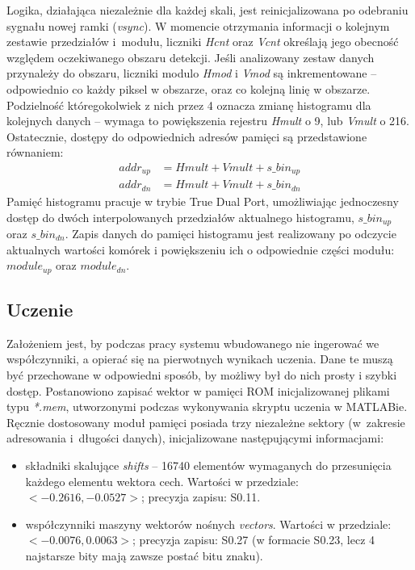 Logika, działająca niezależnie dla każdej skali, jest reinicjalizowana po odebraniu sygnału nowej ramki (\textit{vsync}). 
W momencie otrzymania informacji o kolejnym zestawie przedziałów i~modułu, liczniki \textit{Hcnt} oraz \textit{Vcnt} określają jego obecność względem oczekiwanego obszaru detekcji. %
Jeśli analizowany zestaw danych przynależy do obszaru, liczniki modulo \textit{Hmod} i \textit{Vmod} są inkrementowane -- odpowiednio co każdy piksel w obszarze, oraz co kolejną linię w obszarze. 
Podzielność któregokolwiek z nich przez 4 oznacza zmianę histogramu dla kolejnych danych -- wymaga to powiększenia rejestru \textit{Hmult} o 9, lub \textit{Vmult} o 216. 
Ostatecznie, dostępy do odpowiednich adresów pamięci są przedstawione równaniem:
\begin{equation}
\label{eq:adressing_hist}
\left.\begin{aligned} 
addr_{up}&=Hmult+Vmult+s\_bin_{up} \\ 
addr_{dn}&=Hmult+Vmult+s\_bin_{dn}
\end{aligned}\right.
\end{equation}
Pamięć histogramu pracuje w trybie True Dual Port, umożliwiając jednoczesny dostęp do dwóch interpolowanych przedziałów aktualnego histogramu, $s\_bin_{up}$ oraz $s\_bin_{dn}$. 
Zapis danych do pamięci histogramu jest realizowany po odczycie aktualnych wartości komórek i powiększeniu ich o odpowiednie części modułu: $module_{up}$ oraz $module_{dn}$.


\subsection{Uczenie}
Założeniem jest, by podczas pracy systemu wbudowanego nie ingerować we współczynniki, a opierać się na pierwotnych wynikach uczenia.
Dane te muszą być przechowane w odpowiedni sposób, by możliwy był do nich prosty i szybki dostęp. 
Postanowiono zapisać wektor w pamięci ROM inicjalizowanej plikami typu \textit{*.mem}, utworzonymi podczas wykonywania skryptu uczenia w MATLABie.
Ręcznie dostosowany moduł pamięci posiada trzy niezależne sektory (w~zakresie adresowania i~długości danych), inicjalizowane następującymi informacjami: 

\begin{itemize}
	\item składniki skalujące \textit{shifts} -- 16740 elementów wymaganych do przesunięcia każdego elementu wektora cech. Wartości w przedziale: \mbox{$<-0.2616, -0.0527>$}; precyzja zapisu: S0.11.
	\item współczynniki maszyny wektorów nośnych \textit{vectors}. Wartości w przedziale: \mbox{$<-0.0076, 0.0063>$}; precyzja zapisu: S0.27 (w formacie S0.23, lecz 4 najstarsze bity mają zawsze postać bitu znaku).
\end{itemize}



